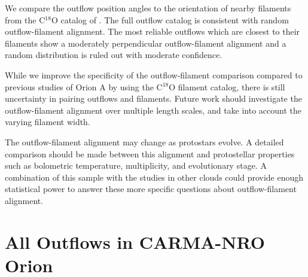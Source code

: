 \documentclass[twocolumn]{aastex63}
\begin{document}
We compare the outflow position angles to the orientation of nearby filaments from the C$^{18}$O catalog of \citet{Suri19}. The full outflow catalog is consistent with random outflow-filament alignment. The most reliable outflows which are closest to their filaments show a moderately perpendicular outflow-filament alignment and a random distribution is ruled out with moderate confidence.


While we improve the specificity of the outflow-filament comparison compared to previous studies of Orion A by using the C$^{18}$O filament catalog, there is still uncertainty in pairing outflows and filaments. Future work should investigate the outflow-filament alignment over multiple length scales, and take into account the varying filament width.

The outflow-filament alignment may change as protostars evolve. A detailed comparison should be made between this alignment and protostellar properties such as bolometric temperature, multiplicity, and evolutionary stage. A combination of this sample with the studies in other clouds could provide enough statistical power to answer these more specific questions about outflow-filament alignment.

\startlongtable

\startlongtable

\startlongtable








\appendix

\section{All Outflows in CARMA-NRO Orion}\label{sec:appendix}

% 
\end{document}
